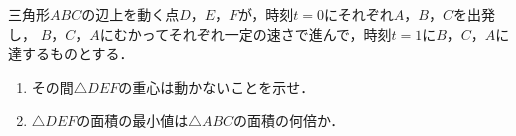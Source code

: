 \documentclass[../../main.tex]{subfiles}
\begin{document}
三角形$ABC$の辺上を動く点$D$，$E$，$F$が，時刻$t=0$にそれぞれ$A$，$B$，$C$を出発し，
$B$，$C$，$A$にむかってそれぞれ一定の速さで進んで，時刻$t=1$に$B$，$C$，$A$に達するものとする．
\begin{enumerate}
  \item その間$\triangle DEF$の重心は動かないことを示せ．
  \item $\triangle DEF$の面積の最小値は$\triangle ABC$の面積の何倍か．
\end{enumerate}
\end{document}
